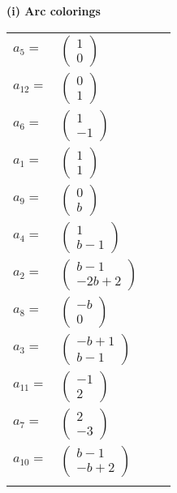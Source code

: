 \documentclass[1p]{elsarticle_modified}
\theoremstyle{definition}
\begin{document}
\flushleft \textbf{(i) Arc colorings}\\
\begin{tabular}{m{7pt} m{180pt} m{7pt} m{180pt} }
\flushright $a_{5}=$&$\begin{pmatrix}1\\0\end{pmatrix}$ \\
\flushright $a_{12}=$&$\begin{pmatrix}0\\1\end{pmatrix}$ \\
\flushright $a_{6}=$&$\begin{pmatrix}1\\-1\end{pmatrix}$ \\
\flushright $a_{1}=$&$\begin{pmatrix}1\\1\end{pmatrix}$ \\
\flushright $a_{9}=$&$\begin{pmatrix}0\\b\end{pmatrix}$ \\
\flushright $a_{4}=$&$\begin{pmatrix}1\\b-1\end{pmatrix}$ \\
\flushright $a_{2}=$&$\begin{pmatrix}b-1\\-2 b+2\end{pmatrix}$ \\
\flushright $a_{8}=$&$\begin{pmatrix}- b\\0\end{pmatrix}$ \\
\flushright $a_{3}=$&$\begin{pmatrix}- b+1\\b-1\end{pmatrix}$ \\
\flushright $a_{11}=$&$\begin{pmatrix}-1\\2\end{pmatrix}$ \\
\flushright $a_{7}=$&$\begin{pmatrix}2\\-3\end{pmatrix}$ \\
\flushright $a_{10}=$&$\begin{pmatrix}b-1\\- b+2\end{pmatrix}$\\&\end{tabular}
\end{document}

